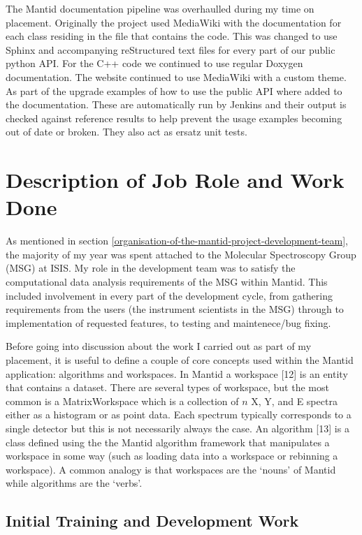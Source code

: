 \documentclass[paper=a4, fontsize=11pt]{scrartcl}	%
\numberwithin{equation}{section}															%
\numberwithin{figure}{section}																%
\numberwithin{table}{section}
\begin{document}
The Mantid documentation pipeline was overhaulled during my time on placement. Originally the project used MediaWiki with the documentation for each class residing in the file that contains the code. This was changed to use Sphinx and accompanying reStructured text files for every part of our public python API. For the C++ code we continued to use regular Doxygen documentation. The website continued to use MediaWiki with a custom theme. As part of the upgrade examples of how to use the public API where added to the documentation. These are automatically run by Jenkins and their output is checked against reference results to help prevent the usage examples becoming out of date or broken. They also act as ersatz unit tests.

\clearpage
\section{Description of Job Role and Work
Done}\label{description-of-job-role-and-work-done}

As mentioned in section \ref{organisation-of-the-mantid-project-development-team}, the
majority of my year was spent attached to the Molecular Spectroscopy
Group (MSG) at ISIS. My role in the development team was to satisfy the
computational data analysis requirements of the MSG within Mantid. This
included involvement in every part of the development cycle, from
gathering requirements from the users (the instrument scientists in the
MSG) through to implementation of requested features, to testing and
maintenece/bug fixing.

Before going into discussion about the work I carried out as part of my
placement, it is useful to define a couple of core concepts used within
the Mantid application: algorithms and workspaces. In Mantid a workspace
{[}12{]} is an entity that contains a dataset. There are several types
of workspace, but the most common is a MatrixWorkspace which is a
collection of $n$ X, Y, and E spectra either as a histogram or as point
data. Each spectrum typically corresponds to a single detector but this is
not necessarily always the case. An algorithm {[}13{]} is a class
defined using the the Mantid algorithm framework that manipulates a
workspace in some way (such as loading data into a workspace or
rebinning a workspace). A common analogy is that workspaces are the
`nouns' of Mantid while algorithms are the `verbs'.

\subsection{Initial Training and Development
Work}\label{initial-training-and-development-work}
\end{document}
